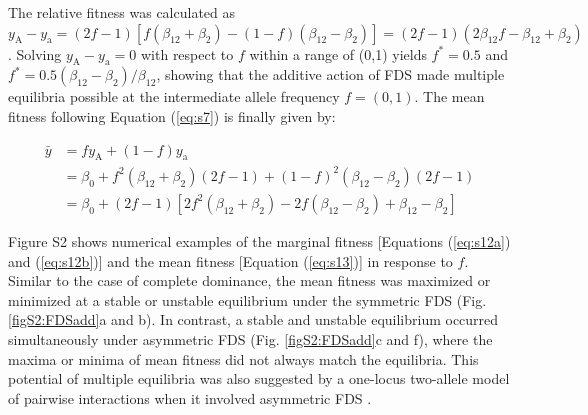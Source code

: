 \documentclass[12pt,]{article}
\begin{document}
\noindent
The relative fitness was calculated as $y_\mathrm{A} - y_\mathrm{a} = (2f-1)[f(\beta_{12}+\beta_2) - (1-f)(\beta_{12}-\beta_2)] = (2f-1)(2\beta_{12}f-\beta_{12}+\beta_2)$. Solving $y_\mathrm{A} - y_\mathrm{a} = 0$ with respect to $f$ within a range of (0,1) yields $f^*=0.5$ and $f^*=0.5(\beta_{12}-\beta_2)/\beta_{12}$, showing that the additive action of FDS made multiple equilibria possible at the intermediate allele frequency $f = (0,1)$. The mean fitness following Equation (\ref{eq:s7}) is finally given by:

\begin{equation}
\begin{split}
\bar{y} &= fy_\mathrm{A} + (1-f)y_\mathrm{a} \\
&= \beta_0 + f^2(\beta_{12}+\beta_2)(2f-1) + (1-f)^2(\beta_{12}-\beta_2)(2f-1)\\
&= \beta_0 + (2f-1)[2f^2(\beta_{12}+\beta_2)-2f(\beta_{12}-\beta_2)+\beta_{12}-\beta_2] \label{eq:s13}
\end{split}
\end{equation}

\noindent
Figure S2 shows numerical examples of the marginal fitness [Equations (\ref{eq:s12a}) and (\ref{eq:s12b})] and the mean fitness [Equation (\ref{eq:s13})] in response to $f$. Similar to the case of complete dominance, the mean fitness was maximized or minimized at a stable or unstable equilibrium under the symmetric FDS (Fig. \ref{figS2:FDSadd}a and b). In contrast, a stable and unstable equilibrium occurred simultaneously under asymmetric FDS (Fig. \ref{figS2:FDSadd}c and f), where the maxima or minima of mean fitness did not always match the equilibria. This potential of multiple equilibria was also suggested by a one-locus two-allele model of pairwise interactions when it involved asymmetric FDS \citep{schneider_maximization_2008}. 
\end{document}
